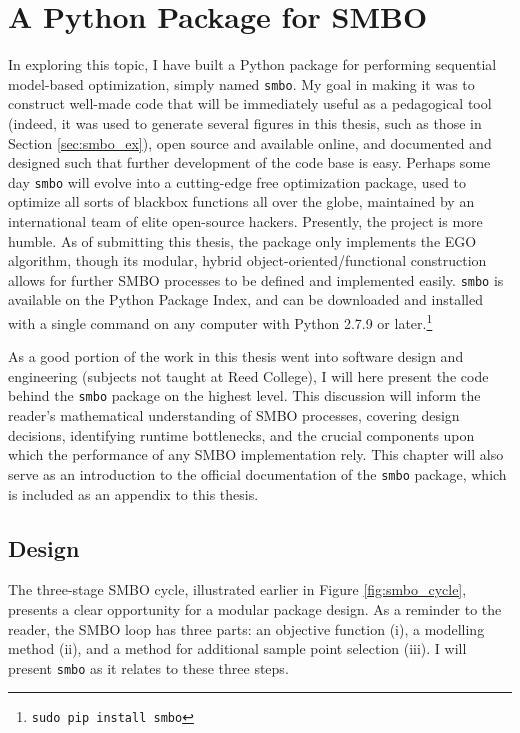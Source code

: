 \chapter{A Python Package for SMBO} \label{ch:code}


In exploring this topic, I have built a Python package for performing sequential model-based optimization, simply named \texttt{smbo}. My goal in making it was to construct well-made code that will be immediately useful as a pedagogical tool (indeed, it was used to generate several figures in this thesis, such as those in Section \ref{sec:smbo_ex}), open source and available online, and documented and designed such that further development of the code base is easy. Perhaps some day \texttt{smbo} will evolve into a cutting-edge free optimization package, used to optimize all sorts of blackbox functions all over the globe, maintained by an international team of elite open-source hackers. Presently, the project is more humble. As of submitting this thesis, the package only implements the EGO algorithm, though its modular, hybrid object-oriented/functional construction allows for further SMBO processes to be defined and implemented easily. \texttt{smbo} is available on the Python Package Index, and can be downloaded and installed with a single command on any computer with Python 2.7.9 or later.\footnote{\texttt{sudo pip install smbo}}

As a good portion of the work in this thesis went into software design and engineering (subjects not taught at Reed College), I will here present the code behind the \texttt{smbo} package on the highest level. This discussion will inform the reader's mathematical understanding of SMBO processes, covering design decisions, identifying runtime bottlenecks, and the crucial components upon which the performance of any SMBO implementation rely. This chapter will also serve as an introduction to the official documentation of the \texttt{smbo} package, which is included as an appendix to this thesis.

\section{Design}\label{sec:design}

The three-stage SMBO cycle, illustrated earlier in Figure \ref{fig:smbo_cycle}, presents a clear opportunity for a modular package design. As a reminder to the reader, the SMBO loop has three parts: an objective function (i), a modelling method (ii), and a method for additional sample point selection (iii). I will present \texttt{smbo} as it relates to these three steps.

